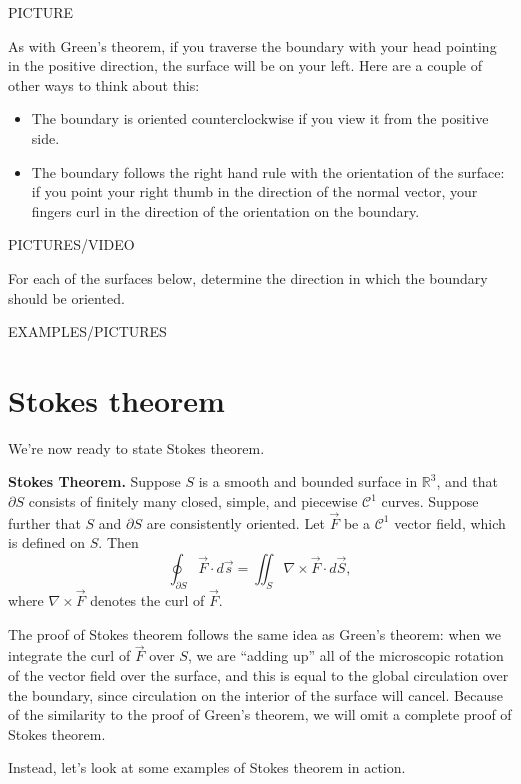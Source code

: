 \documentclass{ximera}
\begin{document}
PICTURE

As with Green's theorem, if you traverse the boundary with your head pointing in the positive direction, the surface will be on your left. Here are a couple of other ways to think about this:
\begin{itemize}
\item The boundary is oriented counterclockwise if you view it from the positive side.
\item The boundary follows the right hand rule with the orientation of the surface: if you point your right thumb in the direction of the normal vector, your fingers curl in the direction of the orientation on the boundary.
\end{itemize}

PICTURES/VIDEO

\begin{example}
For each of the surfaces below, determine the direction in which the boundary should be oriented.

EXAMPLES/PICTURES
\end{example}

\section*{Stokes theorem}

We're now ready to state Stokes theorem.

\begin{theorem}
\textbf{Stokes Theorem.} Suppose $S$ is a smooth and bounded surface in $\mathbb{R}^3$, and that $\partial S$ consists of finitely many closed, simple, and piecewise $\mathcal{C}^1$ curves. Suppose further that $S$ and $\partial S$ are consistently oriented. Let $\vec{F}$ be a $\mathcal{C}^1$ vector field, which is defined on $S$. Then
\[
\oint_{\partial S}\vec{F}\cdot d\vec{s} = \iint_S \nabla\times \vec{F}\cdot d\vec{S},
\]
where $\nabla\times \vec{F}$ denotes the curl of $\vec{F}$.
\end{theorem}

The proof of Stokes theorem follows the same idea as Green's theorem: when we integrate the curl of $\vec{F}$ over $S$, we are ``adding up'' all of the microscopic rotation of the vector field over the surface, and this is equal to the global circulation over the boundary, since circulation on the interior of the surface will cancel. Because of the similarity to the proof of Green's theorem, we will omit a complete proof of Stokes theorem.

Instead, let's look at some examples of Stokes theorem in action.
\end{document}
